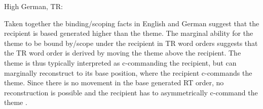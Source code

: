 \begin{exe}
	\ex High German, TR:\label{ex:hg-binding-tr}
\begin{xlist}
\end{xlist}
\end{exe}

Taken together the binding/scoping facts in English and German suggest that the recipient is based generated higher than the theme. The marginal ability for the theme to be bound by/scope under the recipient in TR word orders suggests that the TR word order is derived by moving the theme above the recipient. The theme is thus typically interpreted as c-commanding the recipient, but can marginally reconstruct to its base position, where the recipient c-commands the theme. Since there is no movement in the base generated RT order, no reconstruction is possible and the recipient has to asymmetrically c-command the theme \citep{Takano.1998}.


